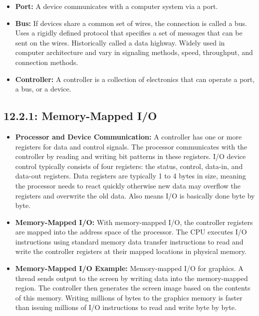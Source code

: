 \documentclass[12pt]{article}
\begin{document}
\begin{itemize}
    \item \textbf{Port:} A device communicates with a computer system via a port.
    \item \textbf{Bus:} If devices share a common set of wires, the connection is called a bus. Uses a rigidly defined protocol that specifies a set of messages that can be sent on the wires. Historically called a data highway. Widely used in computer architecture and vary in signaling methods, speed, throughput, and connection methods.
    \item \textbf{Controller:}  A controller is a collection of electronics that can operate a port, a bus, or a device.
\end{itemize}

\subsection*{12.2.1: Memory-Mapped I/O}

\begin{itemize}
    \item \textbf{Processor and Device Communication:} A controller has one or more registers for data and control signals. The processor communicates with the controller by reading and writing bit patterns in these registers. I/O device control typically consists of four registers: the status, control, data-in, and data-out registers. Data registers are typically 1 to 4 bytes in size, meaning the processor needs to react quickly otherwise new data may overflow the registers and overwrite the old data. Also means I/O is basically done byte by byte.
    \item \textbf{Memory-Mapped I/O:} With memory-mapped I/O, the controller registers are mapped into the address space of the processor. The CPU executes I/O instructions using standard memory data transfer instructions to read and write the controller registers at their mapped locations in physical memory.
    \item \textbf{Memory-Mapped I/O Example:} Memory-mapped I/O for graphics. A thread sends output to the screen by writing data into the memory-mapped region. The controller then generates the screen image based on the contents of this memory. Writing millions of bytes to the graphics memory is faster than issuing millions of I/O instructions to read and write byte by byte.
\end{itemize}
\end{document}
